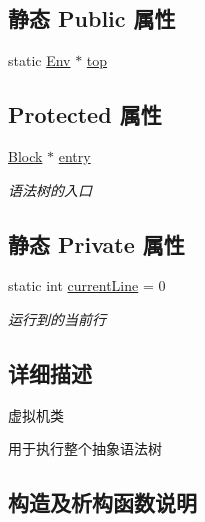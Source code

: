 \subsection*{静态 Public 属性}
\begin{DoxyCompactItemize}
\item 
static \hyperlink{class_env}{Env} $\ast$ \hyperlink{class_vm_a1a83823801a5ab090d9ad20527a6c638}{top}
\end{DoxyCompactItemize}
\subsection*{Protected 属性}
\begin{DoxyCompactItemize}
\item 
\hyperlink{class_block}{Block} $\ast$ \hyperlink{class_vm_ab5aae972ea15ddfd01362e27ed797a51}{entry}\hypertarget{class_vm_ab5aae972ea15ddfd01362e27ed797a51}{}\label{class_vm_ab5aae972ea15ddfd01362e27ed797a51}

\begin{DoxyCompactList}\small\item\em 语法树的入口 \end{DoxyCompactList}\end{DoxyCompactItemize}
\subsection*{静态 Private 属性}
\begin{DoxyCompactItemize}
\item 
static int \hyperlink{class_vm_acfa435ede93d1ba8fe2250fd3469de15}{current\+Line} = 0\hypertarget{class_vm_acfa435ede93d1ba8fe2250fd3469de15}{}\label{class_vm_acfa435ede93d1ba8fe2250fd3469de15}

\begin{DoxyCompactList}\small\item\em 运行到的当前行 \end{DoxyCompactList}\end{DoxyCompactItemize}


\subsection{详细描述}
虚拟机类 

用于执行整个抽象语法树 

\subsection{构造及析构函数说明}
